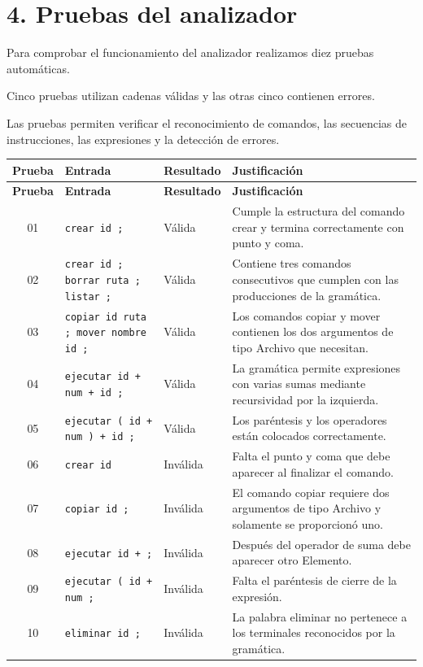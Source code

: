 \documentclass[11pt,letterpaper]{article}
\begin{document}
\section*{4. Pruebas del analizador}

Para comprobar el funcionamiento del analizador
realizamos diez pruebas automáticas.

Cinco pruebas utilizan cadenas válidas y las
otras cinco contienen errores.

Las pruebas permiten verificar el reconocimiento
de comandos, las secuencias de instrucciones,
las expresiones y la detección de errores.

\small

\begin{longtable}{|c|p{4.2cm}|p{2cm}|p{5.8cm}|}
\hline
\textbf{Prueba} &
\textbf{Entrada} &
\textbf{Resultado} &
\textbf{Justificación} \\ \hline
\endfirsthead

\hline
\textbf{Prueba} &
\textbf{Entrada} &
\textbf{Resultado} &
\textbf{Justificación} \\ \hline
\endhead

01 &
\texttt{crear id ;} &
Válida &
Cumple la estructura del comando crear y termina
correctamente con punto y coma. \\ \hline

02 &
\texttt{crear id ; borrar ruta ; listar ;} &
Válida &
Contiene tres comandos consecutivos que cumplen
con las producciones de la gramática. \\ \hline

03 &
\texttt{copiar id ruta ; mover nombre id ;} &
Válida &
Los comandos copiar y mover contienen los dos
argumentos de tipo Archivo que necesitan. \\ \hline

04 &
\texttt{ejecutar id + num + id ;} &
Válida &
La gramática permite expresiones con varias
sumas mediante recursividad por la izquierda. \\ \hline

05 &
\texttt{ejecutar ( id + num ) + id ;} &
Válida &
Los paréntesis y los operadores están colocados
correctamente. \\ \hline

06 &
\texttt{crear id} &
Inválida &
Falta el punto y coma que debe aparecer
al finalizar el comando. \\ \hline

07 &
\texttt{copiar id ;} &
Inválida &
El comando copiar requiere dos argumentos
de tipo Archivo y solamente se proporcionó uno. \\ \hline

08 &
\texttt{ejecutar id + ;} &
Inválida &
Después del operador de suma debe aparecer
otro Elemento. \\ \hline

09 &
\texttt{ejecutar ( id + num ;} &
Inválida &
Falta el paréntesis de cierre de la expresión. \\ \hline

10 &
\texttt{eliminar id ;} &
Inválida &
La palabra eliminar no pertenece a los
terminales reconocidos por la gramática. \\ \hline

\end{longtable}
\end{document}
